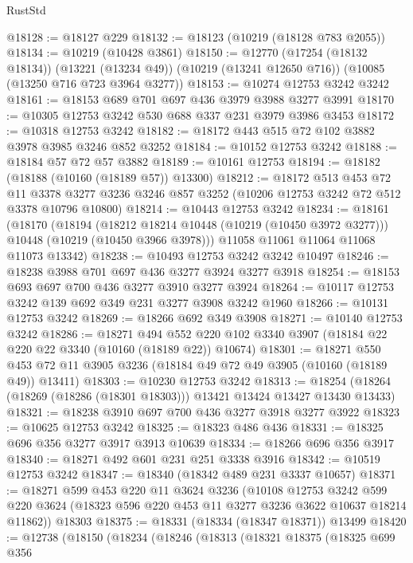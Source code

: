 \begin{lexlean}{RustStd}
\begin{coremodule}
@18128 := @18127 @229
@18132 := @18123 (@10219 (@18128 @783 @2055))
@18134 := @10219 (@10428 @3861)
@18150 := @12770
    (@17254 (@18132 @18134))
    (@13221 (@13234 @49))
    (@10219 (@13241 @12650 @716))
    (@10085 (@13250 @716 @723 @3964 @3277))
@18153 := @10274 @12753 @3242 @3242
@18161 := @18153 @689 @701 @697 @436 @3979 @3988 @3277 @3991
@18170 := @10305 @12753 @3242 @530 @688 @337 @231 @3979 @3986 @3453
@18172 := @10318 @12753 @3242
@18182 := @18172 @443 @515 @72 @102 @3882 @3978 @3985 @3246 @852 @3252
@18184 := @10152 @12753 @3242
@18188 := @18184 @57 @72 @57 @3882
@18189 := @10161 @12753
@18194 := @18182 (@18188 (@10160 (@18189 @57)) @13300)
@18212 := @18172
    @513
    @453
    @72
    @11
    @3378
    @3277
    @3236
    @3246
    @857
    @3252
    (@10206 @12753 @3242 @72 @512 @3378 @10796 @10800)
@18214 := @10443 @12753 @3242
@18234 := @18161
    (@18170
      (@18194
        (@18212 @18214 @10448 (@10219 (@10450 @3972 @3277)))
        @10448
        (@10219 (@10450 @3966 @3978)))
      @11058
      @11061
      @11064
      @11068
      @11073
      @13342)
@18238 := @10493 @12753 @3242 @3242 @10497
@18246 := @18238 @3988 @701 @697 @436 @3277 @3924 @3277 @3918
@18254 := @18153 @693 @697 @700 @436 @3277 @3910 @3277 @3924
@18264 := @10117 @12753 @3242 @139 @692 @349 @231 @3277 @3908 @3242 @1960
@18266 := @10131 @12753 @3242
@18269 := @18266 @692 @349 @3908
@18271 := @10140 @12753 @3242
@18286 := @18271
    @494
    @552
    @220
    @102
    @3340
    @3907
    (@18184 @22 @220 @22 @3340 (@10160 (@18189 @22)) @10674)
@18301 := @18271
    @550
    @453
    @72
    @11
    @3905
    @3236
    (@18184 @49 @72 @49 @3905 (@10160 (@18189 @49)) @13411)
@18303 := @10230 @12753 @3242
@18313 := @18254 (@18264 (@18269 (@18286 (@18301 @18303))) @13421 @13424 @13427 @13430 @13433)
@18321 := @18238 @3910 @697 @700 @436 @3277 @3918 @3277 @3922
@18323 := @10625 @12753 @3242
@18325 := @18323 @486 @436
@18331 := @18325 @696 @356 @3277 @3917 @3913 @10639
@18334 := @18266 @696 @356 @3917
@18340 := @18271 @492 @601 @231 @251 @3338 @3916
@18342 := @10519 @12753 @3242
@18347 := @18340 (@18342 @489 @231 @3337 @10657)
@18371 := @18271
    @599
    @453
    @220
    @11
    @3624
    @3236
    (@10108
      @12753
      @3242
      @599
      @220
      @3624
      (@18323 @596 @220 @453 @11 @3277 @3236 @3622 @10637 @18214 @11862))
    @18303
@18375 := @18331 (@18334 (@18347 @18371)) @13499
@18420 := @12738
    (@18150
      (@18234
        (@18246
          (@18313
            (@18321
              @18375
              (@18325
                @699
                @356

\end{coremodule}
\end{lexlean}
